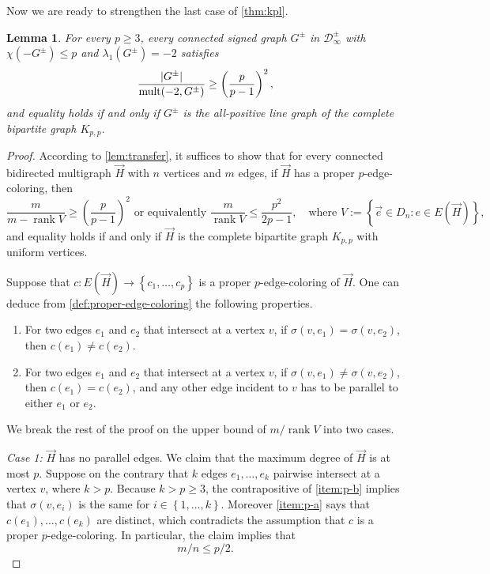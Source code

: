 \documentclass[11pt]{article}
\newtheorem{lemma}[theorem]{Lemma}
\theoremstyle{definition}
\theoremstyle{remark}
\DeclareMathOperator{\rank}{rank}
\DeclarePairedDelimiter\abs{\lvert}{\rvert}
\newcommand{\dset}[2]{\left\{{#1}\colon{#2}\right\}}
\newcommand{\sset}[1]{\left\{{#1}\right\}}
\newcommand{\la}{\lambda}
\newcommand{\D}{\mathcal{D}}
\newcommand{\mult}{\operatorname{mult}}
\begin{document}
Now we are ready to strengthen the last case of \cref{thm:kpl}.

\begin{lemma} \label{lem:d-infinity}
    For every $p \ge 3$, every connected signed graph $G^\pm$ in $\D_\infty^\pm$ with $\chi(-G^\pm) \le p$ and $\la_1(G^\pm) = -2$ satisfies
    \[
        \frac{\abs{G^\pm}}{\mult(-2, G^\pm)} \ge \left(\frac{p}{p-1}\right)^2,
    \]
    and equality holds if and only if $G^\pm$ is the all-positive line graph of the complete bipartite graph $K_{p,p}$.
\end{lemma}

\begin{proof}
    According to \cref{lem:transfer}, it suffices to show that for every connected bidirected multigraph $\vec{H}$ with $n$ vertices and $m$ edges, if $\vec{H}$ has a proper $p$-edge-coloring, then
    \[
        \frac{m}{m - \rank V} \ge \left(\frac{p}{p-1}\right)^2 \text{ or equivalently }\frac{m}{\rank V} \le \frac{p^2}{2p-1}, \quad\text{where } V := \dset{\vec{e} \in D_n}{e \in E(\vec{H})},
    \]
    and equality holds if and only if $\vec{H}$ is the complete bipartite graph $K_{p,p}$ with uniform vertices.

    Suppose that $c\colon E(\vec{H}) \to \sset{c_1, \dots, c_p}$ is a proper $p$-edge-coloring of $\vec{H}$. One can deduce from \cref{def:proper-edge-coloring} the following properties.
    \begin{enumerate}[label=(\alph*)]
        \item For two edges $e_1$ and $e_2$ that intersect at a vertex $v$, if $\sigma(v, e_1) = \sigma(v, e_2)$, then $c(e_1) \neq c(e_2)$.\label{item:p-a}
        \item For two edges $e_1$ and $e_2$ that intersect at a vertex $v$, if $\sigma(v, e_1) \neq \sigma(v, e_2)$, then $c(e_1) = c(e_2)$, and any other edge incident to $v$ has to be parallel to either $e_1$ or $e_2$.\label{item:p-b}
    \end{enumerate}
    We break the rest of the proof on the upper bound of $m / \rank V$ into two cases.

    \bigskip
    \noindent\textit{Case 1:} $\vec{H}$ has no parallel edges. We claim that the maximum degree of $\vec{H}$ is at most $p$. Suppose on the contrary that $k$ edges $e_1, \dots, e_k$ pairwise intersect at a vertex $v$, where $k > p$. Because $k > p \ge 3$, the contrapositive of \ref{item:p-b} implies that $\sigma(v, e_i)$ is the same for $i \in \sset{1, \dots, k}$. Moreover \ref{item:p-a} says that $c(e_1), \dots, c(e_k)$ are distinct, which contradicts the assumption that $c$ is a proper $p$-edge-coloring. In particular, the claim implies that \begin{equation} \label{eqn:kpl-m}
        m/n \le p/2.
    \end{equation}
    

\end{proof}
\end{document}
